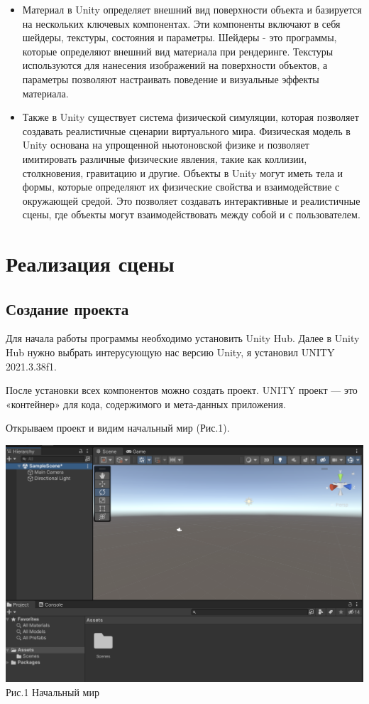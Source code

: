 \documentclass[a4paper,12pt]{article}
\begin{document}
\begin{itemize}
\item 	Материал в Unity определяет внешний вид поверхности объекта и базируется на нескольких ключевых компонентах. Эти компоненты включают в себя шейдеры, текстуры, состояния и параметры. Шейдеры - это программы, которые определяют внешний вид материала при рендеринге. Текстуры используются для нанесения изображений на поверхности объектов, а параметры позволяют настраивать поведение и визуальные эффекты материала.
	
\item 	Также в Unity существует система физической симуляции, которая позволяет создавать реалистичные сценарии виртуального мира. Физическая модель в Unity основана на упрощенной ньютоновской физике и позволяет имитировать различные физические явления, такие как коллизии, столкновения, гравитацию и другие. Объекты в Unity могут иметь тела и формы, которые определяют их физические свойства и взаимодействие с окружающей средой. Это позволяет создавать интерактивные и реалистичные сцены, где объекты могут взаимодействовать между собой и с пользователем.
\end{itemize}

\newpage
\section{Реализация сцены}

\subsection{Создание проекта}
Для начала работы программы необходимо установить Unity Hub. Далее в Unity Hub нужно выбрать интерусующую нас версию Unity, я установил UNITY 2021.3.38f1.

После установки всех компонентов можно создать проект. UNITY проект — это «контейнер» для кода, содержимого и мета-данных приложения.

Открываем проект и видим начальный мир (Рис.1).

\begin{center}
	\includegraphics[scale = 0.5]{1.png}\\
	Рис.1 Начальный мир
\end{center}
\end{document}
